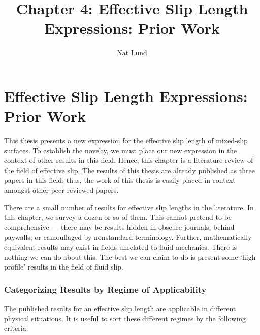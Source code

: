 \documentclass[12pt, a4paper, twoside, openright]{book}
\title{Chapter 4: Effective Slip Length Expressions: Prior Work}
\author{Nat Lund}
\begin{document}
\chapter{Effective Slip Length Expressions: Prior Work}

This thesis presents a new expression for the effective slip length of mixed-slip surfaces.  To establish the novelty, we must place our new expression in the context of other results in this field.  Hence, this chapter is a literature review of the field of effective slip.  The results of this thesis are already published as three papers in this field; thus, the work of this thesis is easily placed in context amongst other peer-reviewed papers.

There are a small number of results for effective slip lengths in the literature.  In this chapter, we survey a dozen or so of them.  This cannot pretend to be comprehensive --- there may be results hidden in obscure journals, behind paywalls, or camouflaged by nonstandard terminology.  Further, mathematically equivalent results may exist in fields unrelated to fluid mechanics.  There is nothing we can do about this.  The best we can claim to do is present some `high profile' results in the field of fluid slip.

\subsection*{Categorizing Results by Regime of Applicability}

The published results for an effective slip length are applicable in different physical situations.  It is useful to sort these different regimes by the following criteria:
\end{document}
